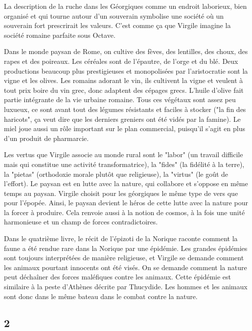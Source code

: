 \documentclass[a4paper,12pt]{book}
\begin{document}
\par La description de la ruche dans les Géorgiques comme un endroit laborieux, bien organisé et qui tourne autour d'un souverain symbolise une société où un souverain fort prescrirait les valeurs. C'est comme ça que Virgile imagine la société romaine parfaite sous Octave.
\par Dans le monde paysan de Rome, on cultive des fèves, des lentilles, des choux, des rapes et des poireaux. Les céréales sont de l'épautre, de l'orge et du blé. Deux productions beaucoup plus prestigieuses et monopolisées par l'aristocratie sont la vigne et les olives. Les romains adorant le vin, ils cultivent la vigne et veulent à tout prix boire du vin grec, donc adaptent des cépages grecs. L'huile d'olive fait partie intégrante de la vie urbaine romaine. Tous ces végétaux sont assez peu luxueux, ce sont avant tout des légumes résistants et faciles à stocker ("la fin des haricots", ça veut dire que les derniers greniers ont été vidés par la famine). Le miel joue aussi un rôle important sur le plan commercial, puisqu'il s'agit en plus d'un produit de pharmarcie.
\par Les vertus que Virgile associe au monde rural sont le "labor" (un travail difficile mais qui constitue une activité transformatrice), la "fides" (la fidélité à la terre), la "pietas" (orthodoxie morale plutôt que religieuse), la "virtus" (le goût de l'effort). Le paysan est en lutte avec la nature, qui collabore et s'oppose en même temps au paysan. Virgile choisit pour les géorgiques le même type de vers que pour l'épopée. Ainsi, le paysan devient le héros de cette lutte avec la nature pour la forcer à produire. Cela renvoie aussi à la notion de cosmos, à la fois une unité harmonieuse et un champ de forces contradictoires.
\par Dans le quatrième livre, le récit de l'épizoti de la Norique raconte comment la faune a été rendue rare dans la Norique par une épidémie. Les grandes épidémies sont toujours interprétées de manière religieuse, et Virgile se demande comment les animaux pourtant innocents ont été visés. On se demande comment la nature peut déchaîner des forces maléfiques contre les animaux. Cette épidémie est similaire à la peste d'Athènes décrite par Thucydide. Les hommes et les animaux sont donc dans le même bateau dans le combat contre la nature.

\subsection{2}
\end{document}
